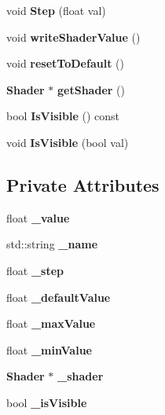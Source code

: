 \begin{DoxyCompactItemize}
\item 
void {\bfseries Step} (float val)\label{classsfs__visualizer_1_1Property_a8537b944bc4fe8a82e4f8d7a3f5fe981}

\item 
void {\bfseries write\-Shader\-Value} ()\label{classsfs__visualizer_1_1Property_a83a7f12a8cb533032c0723f3a5f58f43}

\item 
void {\bfseries reset\-To\-Default} ()\label{classsfs__visualizer_1_1Property_a3634270ca6989002d26f3f2988914b8f}

\item 
{\bf Shader} $\ast$ {\bfseries get\-Shader} ()\label{classsfs__visualizer_1_1Property_ac2be22856a8d08abdaefbe0140c8e6e8}

\item 
bool {\bfseries Is\-Visible} () const \label{classsfs__visualizer_1_1Property_ab3c00edd610dbfc12915379e5e73b9ad}

\item 
void {\bfseries Is\-Visible} (bool val)\label{classsfs__visualizer_1_1Property_a3fa69ca189e0fadffca0b2305cf6af3a}

\end{DoxyCompactItemize}
\subsection*{Private Attributes}
\begin{DoxyCompactItemize}
\item 
float {\bfseries \-\_\-value}\label{classsfs__visualizer_1_1Property_ad66b33a0c3e739d404e398bc6ffad94d}

\item 
std\-::string {\bfseries \-\_\-name}\label{classsfs__visualizer_1_1Property_a682d86a90812e7a3c15fae98f61a08e4}

\item 
float {\bfseries \-\_\-step}\label{classsfs__visualizer_1_1Property_abbaaffe58bd9f6e8652e909bc8af2ef4}

\item 
float {\bfseries \-\_\-default\-Value}\label{classsfs__visualizer_1_1Property_a29fa42cc26cd53c8647b9b39b8f392ff}

\item 
float {\bfseries \-\_\-max\-Value}\label{classsfs__visualizer_1_1Property_a5b0ba0433a8e113a3f161743ae780ba7}

\item 
float {\bfseries \-\_\-min\-Value}\label{classsfs__visualizer_1_1Property_a86ebd202495edd89e5e927ac03d88616}

\item 
{\bf Shader} $\ast$ {\bfseries \-\_\-shader}\label{classsfs__visualizer_1_1Property_a2ba2422edef8ab50e856625b53b58cd4}

\item 
bool {\bfseries \-\_\-is\-Visible}\label{classsfs__visualizer_1_1Property_a0a15bcdef46072e38b3c019f54e632c2}

\end{DoxyCompactItemize}



